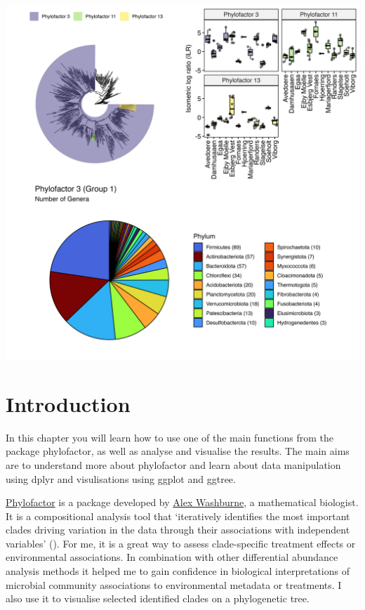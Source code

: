 \documentclass[
]{book}
\begin{document}
\includegraphics{./img/phylofactor.png}

\hypertarget{introduction-5}{%
\section{Introduction}\label{introduction-5}}

In this chapter you will learn how to use one of the main functions from the package phylofactor, as well as analyse and visualise the results. The main aims are to understand more about phylofactor and learn about data manipulation using dplyr and visulisations using ggplot and ggtree.

\href{https://github.com/reptalex/phylofactor}{Phylofactor} is a package developed by \href{https://github.com/reptalex}{Alex Washburne}, a mathematical biologist. It is a compositional analysis tool that `iteratively identifies the most important clades driving variation in the data through their associations with independent variables' (\citet{Washburne2017}). For me, it is a great way to assess clade-specific treatment effects or environmental associations. In combination with other differential abundance analysis methods it helped me to gain confidence in biological interpretations of microbial community associations to environmental metadata or treatments. I also use it to visualise selected identified clades on a phylogenetic tree.
\end{document}
